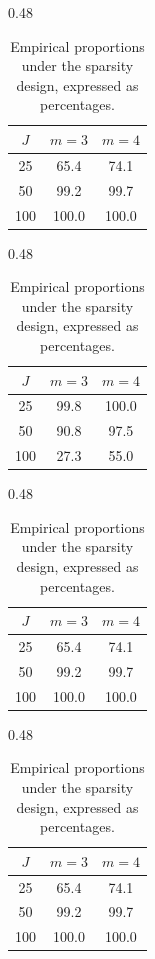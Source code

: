 \begin{table}[htbp]
\centering
\begin{subtable}[t]{0.48\textwidth}
\centering
\begin{tabular}{c cc}
\toprule
\(J\) & \(m=3\) & \(m=4\)\\
\midrule
25 & 65.4 & 74.1\\
50 & 99.2 & 99.7\\
100 & 100.0 & 100.0\\
\bottomrule
\end{tabular}
\caption{\(\widehat{\P}(I_{\mathrm{id}}=1)\).}
\end{subtable}
\hfill
\begin{subtable}[t]{0.48\textwidth}
\centering
\begin{tabular}{c cc}
\toprule
\(J\) & \(m=3\) & \(m=4\)\\
\midrule
25 & 99.8 & 100.0\\
50 & 90.8 & 97.5\\
100 & 27.3 & 55.0\\
\bottomrule
\end{tabular}
\caption{\(\widehat{\P}(I_{\mathrm{comp}}=0\mid I_{\mathrm{id}}=1)\).}
\end{subtable}

\vspace{0.8em}

\begin{subtable}[t]{0.48\textwidth}
\centering
\begin{tabular}{c cc}
\toprule
\(J\) & \(m=3\) & \(m=4\)\\
\midrule
25 & 65.4 & 74.1\\
50 & 99.2 & 99.7\\
100 & 100.0 & 100.0\\
\bottomrule
\end{tabular}
\caption{\(\widehat{\P}(I_{\mathrm{2c}}=1)\).}
\end{subtable}
\hfill
\begin{subtable}[t]{0.48\textwidth}
\centering
\begin{tabular}{c cc}
\toprule
\(J\) & \(m=3\) & \(m=4\)\\
\midrule
25 & 65.4 & 74.1\\
50 & 99.2 & 99.7\\
100 & 100.0 & 100.0\\
\bottomrule
\end{tabular}
\caption{\(\widehat{\P}(I_{\mathrm{3c}}=1)\).}
\end{subtable}
\caption{Empirical proportions under the sparsity design, expressed as percentages.}
\label{tab:sparse}
\end{table}

